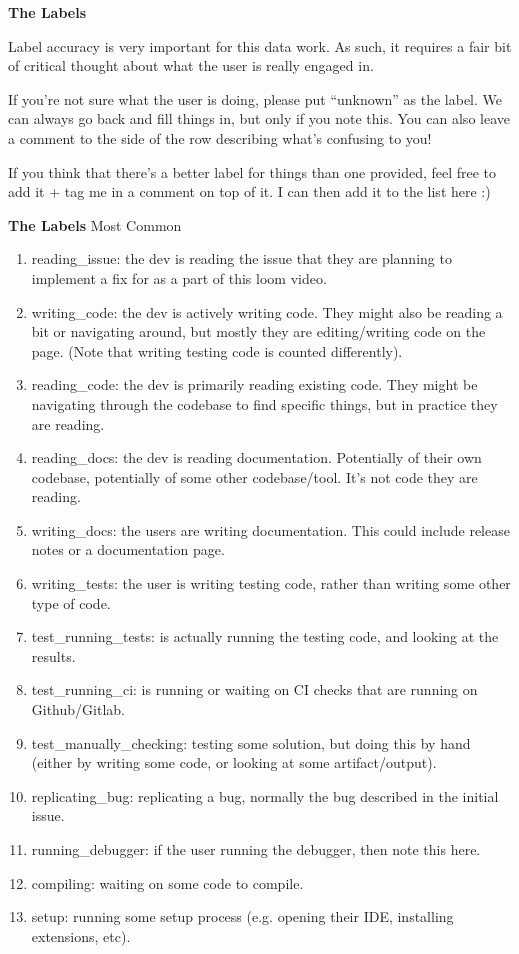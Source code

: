 \documentclass{article}
\begin{document}
\begin{instructionbox}
\textbf{The Labels}

Label accuracy is very important for this data work. As such, it requires a fair bit of critical thought about what the user is really engaged in.

If you’re not sure what the user is doing, please put “unknown” as the label. We can always go back and fill things in, but only if you note this. You can also leave a comment to the side of the row describing what’s confusing to you!

If you think that there’s a better label for things than one provided, feel free to add it + tag me in a comment on top of it. I can then add it to the list here :) 

\textbf{The Labels}
Most Common
\begin{enumerate}
    \item reading\_issue: the dev is reading the issue that they are planning to implement a fix for as a part of this loom video. 
    \item writing\_code: the dev is actively writing code. They might also be reading a bit or navigating around, but mostly they are editing/writing code on the page. (Note that writing testing code is counted differently).
    \item reading\_code: the dev is primarily reading existing code. They might be navigating through the codebase to find specific things, but in practice they are reading.
    \item reading\_docs: the dev is reading documentation. Potentially of their own codebase, potentially of some other codebase/tool. It’s not code they are reading.
    \item writing\_docs: the users are writing documentation. This could include release notes or a documentation page.
    \item writing\_tests: the user is writing testing code, rather than writing some other type of code.
        \item test\_running\_tests: is actually running the testing code, and looking at the results.
    \item test\_running\_ci: is running or waiting on CI checks that are running on Github/Gitlab.
    \item test\_manually\_checking: testing some solution, but doing this by hand (either by writing some code, or looking at some artifact/output).
    \item replicating\_bug: replicating a bug, normally the bug described in the initial issue.
    \item running\_debugger: if the user running the debugger, then note this here.
    \item compiling: waiting on some code to compile.
    \item setup: running some setup process (e.g. opening their IDE, installing extensions, etc).
\end{enumerate}


\end{instructionbox}
\end{document}
